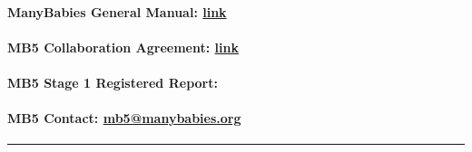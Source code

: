 \documentclass[
]{book}
\begin{document}
\hypertarget{manybabies-general-manual-link}{%
\paragraph*{\texorpdfstring{\textbf{ManyBabies General Manual:} \href{https://docs.google.com/document/d/1dZ3sF2UcxvpkfOfKSKFeObTMZRbpUYloMUiPYtZy0ng/edit?usp=sharing}{link}}{ManyBabies General Manual: link}}\label{manybabies-general-manual-link}}

\hypertarget{mb5-collaboration-agreement-link}{%
\paragraph*{\texorpdfstring{\textbf{MB5 Collaboration Agreement:} \href{https://docs.google.com/document/d/1vbTDmH6euda5pJN4uyds3zsnQ1DXrW9wpHogwC-5TSk/edit?usp=sharing}{link}}{MB5 Collaboration Agreement: link}}\label{mb5-collaboration-agreement-link}}

\hypertarget{mb5-stage-1-registered-report-kosiezettersten2024}{%
\paragraph*{\texorpdfstring{\textbf{MB5 Stage 1 Registered Report:} \citep{kosiezettersten2024}}{MB5 Stage 1 Registered Report: {[}@kosiezettersten2024{]}}}\label{mb5-stage-1-registered-report-kosiezettersten2024}}

\hypertarget{mb5-contact-mb5manybabies.org}{%
\paragraph*{\texorpdfstring{\textbf{MB5 Contact:} \url{mb5@manybabies.org} }{MB5 Contact: mb5@manybabies.org }}\label{mb5-contact-mb5manybabies.org}}

\begin{center}\rule{0.5\linewidth}{0.5pt}\end{center}
\end{document}
